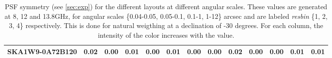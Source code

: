 \begin{table}[!htp]
{{\begin{tabular}{|lcccc||cccc||cccc|}
SKA1W9-0A72B120 & 0.02 \cellcolor{blue!60.00} & 0.00 \cellcolor{red!18.00} & 0.01 \cellcolor{green!18.00} & 0.00 \cellcolor{orange!18.00} & 0.01 \cellcolor{blue!18.00} & 0.00 \cellcolor{red!18.00} & 0.00 \cellcolor{green!18.00} & 0.02 \cellcolor{orange!18.00} & 0.00 \cellcolor{blue!18.00} & 0.00 \cellcolor{red!18.00} & 0.01 \cellcolor{green!18.00} & 0.01 \cellcolor{orange!60.00}\tabularnewline \hline 
\end{tabular}}\hfil 

\caption{PSF symmetry (see \autoref{sec:exp})  for the different layouts at different angular scales. These values are generated at 8, 12 and 13.8GHz, for angular scales \{0.04-0.05, 0.05-0.1, 0.1-1, 1-12\} arcsec and are labeled {\it resbin} \{1, 2, 3, 4\} respectively. This is done for natural weigthing at a declination of -30 degrees. For each column, the intensity of the color increases with the value.}\label{tab:psf_sym}}
 \end{table}
